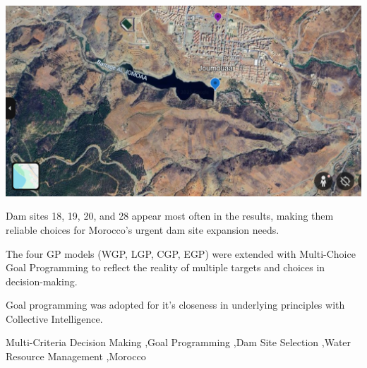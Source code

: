 \begin{frontmatter}
    \begin{graphicalabstract}
        \includegraphics[width=\linewidth]{figures/joumaa}
    \end{graphicalabstract}

    \begin{highlights}
        \item Dam sites 18, 19, 20, and 28 appear most often in the results, making them reliable choices for Morocco's urgent dam site expansion needs.
        \item The four GP models (WGP, LGP, CGP, EGP) were extended with Multi-Choice Goal Programming to reflect the reality of multiple targets and choices in decision-making.
        \item Goal programming was adopted for it's closeness in underlying principles with Collective Intelligence.
    \end{highlights}

    \begin{keyword}
        Multi-Criteria Decision Making \sep Goal Programming \sep Dam Site Selection \sep Water Resource Management \sep Morocco
    \end{keyword}

\end{frontmatter}
